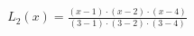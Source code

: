 \documentclass[preview]{standalone}
\begin{document}
\begin{align*}
L_2(x) = \frac{(x - 1) \cdot (x - 2) \cdot (x - 4)}{(3 - 1) \cdot (3 - 2) \cdot (3 - 4)}
\end{align*}
\end{document}
